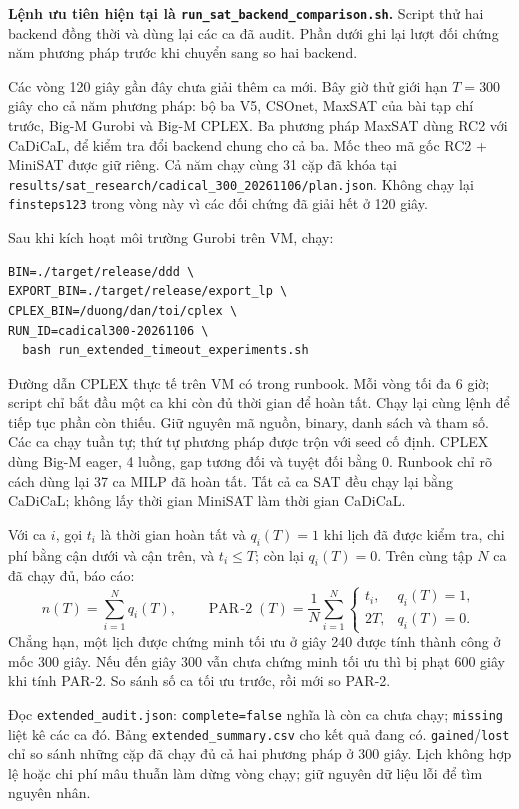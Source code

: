 \documentclass[11pt,a4paper]{article}
\newcommand{\code}[1]{\texttt{#1}}
\newcommand{\file}[1]{\nolinkurl{#1}}
\begin{document}
\textbf{Lệnh ưu tiên hiện tại là \file{run_sat_backend_comparison.sh}.}
Script thử hai backend đồng thời và dùng lại các ca đã audit. Phần dưới ghi
lại lượt đối chứng năm phương pháp trước khi chuyển sang so hai backend.

Các vòng 120 giây gần đây chưa giải thêm ca mới. Bây giờ thử giới hạn
$T=300$ giây cho cả năm phương pháp: bộ ba V5, CSOnet, MaxSAT của bài tạp
chí trước, Big-M Gurobi và Big-M CPLEX. Ba phương pháp MaxSAT dùng RC2
với CaDiCaL, để kiểm tra đổi backend chung cho cả ba. Mốc theo mã gốc
RC2 + MiniSAT được giữ riêng.
Cả năm chạy cùng 31 cặp đã khóa tại
\file{results/sat_research/cadical_300_20261106/plan.json}. Không chạy lại
\code{finsteps123} trong vòng này vì các đối chứng đã giải hết ở 120 giây.

Sau khi kích hoạt môi trường Gurobi trên VM, chạy:
\begin{verbatim}
BIN=./target/release/ddd \
EXPORT_BIN=./target/release/export_lp \
CPLEX_BIN=/duong/dan/toi/cplex \
RUN_ID=cadical300-20261106 \
  bash run_extended_timeout_experiments.sh
\end{verbatim}
Đường dẫn CPLEX thực tế trên VM có trong runbook. Mỗi vòng tối đa 6 giờ;
script chỉ bắt đầu một ca khi còn đủ thời gian để hoàn tất. Chạy lại cùng
lệnh để tiếp tục phần còn thiếu. Giữ nguyên mã nguồn, binary, danh sách và
tham số. Các ca chạy tuần tự; thứ tự phương pháp được trộn với seed cố định.
CPLEX dùng Big-M eager, 4 luồng, gap tương đối và tuyệt đối bằng 0.
Runbook chỉ rõ cách dùng lại 37 ca MILP đã hoàn tất. Tất cả ca SAT đều
chạy lại bằng CaDiCaL; không lấy thời gian MiniSAT làm thời gian CaDiCaL.

Với ca $i$, gọi $t_i$ là thời gian hoàn tất và $q_i(T)=1$ khi lịch đã được
kiểm tra, chi phí bằng cận dưới và cận trên, và $t_i\le T$; còn lại
$q_i(T)=0$. Trên cùng tập $N$ ca đã chạy đủ, báo cáo:
\[
 n(T)=\sum_{i=1}^N q_i(T),\qquad
 \operatorname{PAR\!\text{-}2}(T)
 =\frac{1}{N}\sum_{i=1}^N
 \begin{cases}
 t_i,&q_i(T)=1,\\
 2T,&q_i(T)=0.
 \end{cases}
\]
Chẳng hạn, một lịch được chứng minh tối ưu ở giây 240 được tính thành công
ở mốc 300 giây. Nếu đến giây 300 vẫn chưa chứng minh tối ưu thì bị phạt
600 giây khi tính PAR-2. So sánh số ca tối ưu trước, rồi mới so PAR-2.

Đọc \file{extended_audit.json}: \code{complete=false} nghĩa là còn ca chưa
chạy; \code{missing} liệt kê các ca đó. Bảng \file{extended_summary.csv}
cho kết quả đang có. \code{gained}/\code{lost} chỉ so sánh những cặp đã chạy
đủ cả hai phương pháp ở 300 giây. Lịch không hợp lệ hoặc chi phí mâu thuẫn
làm dừng vòng chạy; giữ nguyên dữ liệu lỗi để tìm nguyên nhân.
\end{document}
